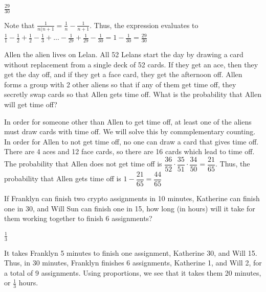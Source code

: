 \documentclass[11pt]{article}
\begin{document}
\begin{answer}
$\frac{29}{30}$
\end{answer}

\begin{solution}
Note that $\frac{1}{n(n+1} = \frac{1}{n} - \frac{1}{n+1}$. Thus, the expression evaluates to $\frac{1}{1} - \frac{1}{2} + \frac{1}{2} - \frac{1}{3} + ... - \frac{1}{29} + \frac{1}{29} - \frac{1}{30} = 1-\frac{1}{30} = \boxed{\frac{29}{30}}$
\end{solution}

\begin{problem}
Allen the alien lives on Lelan. All 52 Lelans start the day by drawing a card without replacement from a single deck of 52 cards. If they get an ace, then they get the day off, and if they get a face card, they get the afternoon off. Allen forms a group with 2 other aliens so that if any of them get time off, they secretly swap cards so that Allen gets time off. What is the probability that Allen will get time off?
\end{problem}

\begin{answer}

\end{answer}

\begin{solution}
In order for someone other than Allen to get time off, at least one of the aliens must draw cards with time off. We will solve this by commplementary counting. In order for Allen to not get time off, no one can draw a card that gives time off. There are 4 aces and 12 face cards, so there are 16 cards which lead to time off. The probability that Allen does not get time off is $\dfrac{36}{52}\cdot \dfrac{35}{51} \cdot \dfrac{34}{50} = \dfrac{21}{65}$. Thus, the probability that Allen gets time off is $1-\dfrac{21}{65} = \boxed{\dfrac{44}{65}}$
\end{solution}

\begin{problem}
If Franklyn can finish two crypto assignments in 10 minutes, Katherine can finish one in 30, and Will Sun can finish one in 15, how long (in hours) will it take for them working together to finish 6 assignments?
\end{problem}

\begin{answer}
$\frac{1}{3}$
\end{answer}

\begin{solution}
It takes Franklyn 5 minutes to finish one assignment, Katherine 30, and Will 15. Thus, in 30 minutes, Franklyn finishes 6 assignments, Katherine 1, and Will 2, for a total of 9 assignments. Using proportions, we see that it takes them 20 minutes, or $\boxed{\frac{1}{3}}$ hours.
\end{solution}
\end{document}
